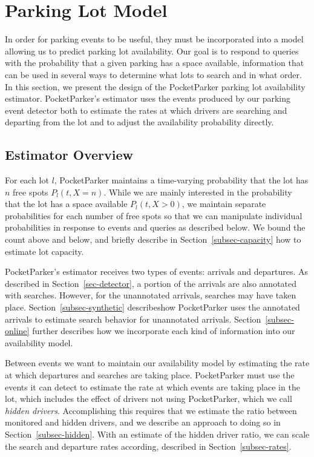 \section{Parking Lot Model}
\label{sec-model}

In order for parking events to be useful, they must be incorporated into a
model allowing us to predict parking lot availability. Our goal is to respond
to queries with the probability that a given parking has a space available,
information that can be used in several ways to determine what lots to search
and in what order. In this section, we present the design of the PocketParker
parking lot availability estimator. PocketParker's estimator uses the events
produced by our parking event detector both to estimate the rates at which
drivers are searching and departing from the lot and to adjust the
availability probability directly.

\subsection{Estimator Overview}

For each lot $l$, PocketParker maintains a time-varying probability that the
lot has $n$ free spots $P_l(t, X = n)$. While we are mainly interested in the
probability that the lot has a space available $P_l(t, X > 0)$, we maintain
separate probabilities for each number of free spots so that we can
manipulate individual probabilities in response to events and queries as
described below. We bound the count above and below, and briefly describe in
Section~\ref{subsec-capacity} how to estimate lot capacity.

PocketParker's estimator receives two types of events: arrivals and
departures. As described in Section~\ref{sec-detector}, a portion of the
arrivals are also annotated with searches. However, for the unannotated
arrivals, searches may have taken place. Section~\ref{subsec-synthetic}
describeshow PocketParker uses the annotated arrivals to estimate search
behavior for unannotated arrivals. Section~\ref{subsec-online} further
describes how we incorporate each kind of information into our availability
model.

Between events we want to maintain our availability model by estimating the
rate at which departures and searches are taking place. PocketParker must use
the events it can detect to estimate the rate at which events are taking
place in the lot, which includes the effect of drivers not using
PocketParker, which we call \textit{hidden drivers}. Accomplishing this
requires that we estimate the ratio between monitored and hidden drivers, and
we describe an approach to doing so in Section~\ref{subsec-hidden}. With an
estimate of the hidden driver ratio, we can scale the search and departure
rates according, described in Section~\ref{subsec-rates}.

